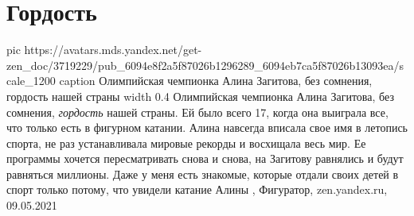 
 
 
 
 
\chapter{Гордость}

\ifcmt
  pic https://avatars.mds.yandex.net/get-zen_doc/3719229/pub_6094e8f2a5f87026b1296289_6094eb7ca5f87026b13093ea/scale_1200
	caption Олимпийская чемпионка Алина Загитова, без сомнения, гордость нашей страны
	width 0.4
\fi
Олимпийская чемпионка Алина Загитова, без сомнения, \emph{гордость} нашей страны. Ей
было всего 17, когда она выиграла все, что только есть в фигурном катании.
Алина навсегда вписала свое имя в летопись спорта, не раз устанавливала мировые
рекорды и восхищала весь мир. Ее программы хочется пересматривать снова и
снова, на Загитову равнялись и будут равняться миллионы. Даже у меня есть
знакомые, которые отдали своих детей в спорт только потому, что увидели катание
Алины
, 
Фигуратор, zen.yandex.ru, 09.05.2021

